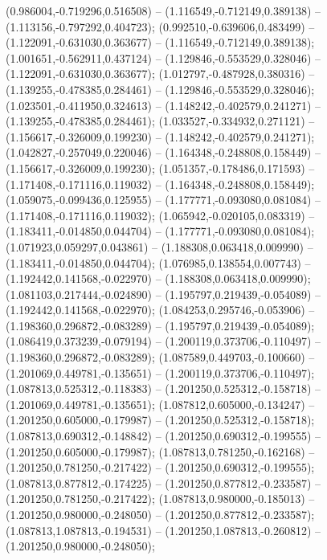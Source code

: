  (0.986004,-0.719296,0.516508) -- (1.116549,-0.712149,0.389138) -- (1.113156,-0.797292,0.404723);
 (0.992510,-0.639606,0.483499) -- (1.122091,-0.631030,0.363677) -- (1.116549,-0.712149,0.389138);
 (1.001651,-0.562911,0.437124) -- (1.129846,-0.553529,0.328046) -- (1.122091,-0.631030,0.363677);
 (1.012797,-0.487928,0.380316) -- (1.139255,-0.478385,0.284461) -- (1.129846,-0.553529,0.328046);
 (1.023501,-0.411950,0.324613) -- (1.148242,-0.402579,0.241271) -- (1.139255,-0.478385,0.284461);
 (1.033527,-0.334932,0.271121) -- (1.156617,-0.326009,0.199230) -- (1.148242,-0.402579,0.241271);
 (1.042827,-0.257049,0.220046) -- (1.164348,-0.248808,0.158449) -- (1.156617,-0.326009,0.199230);
 (1.051357,-0.178486,0.171593) -- (1.171408,-0.171116,0.119032) -- (1.164348,-0.248808,0.158449);
 (1.059075,-0.099436,0.125955) -- (1.177771,-0.093080,0.081084) -- (1.171408,-0.171116,0.119032);
 (1.065942,-0.020105,0.083319) -- (1.183411,-0.014850,0.044704) -- (1.177771,-0.093080,0.081084);
 (1.071923,0.059297,0.043861) -- (1.188308,0.063418,0.009990) -- (1.183411,-0.014850,0.044704);
 (1.076985,0.138554,0.007743) -- (1.192442,0.141568,-0.022970) -- (1.188308,0.063418,0.009990);
 (1.081103,0.217444,-0.024890) -- (1.195797,0.219439,-0.054089) -- (1.192442,0.141568,-0.022970);
 (1.084253,0.295746,-0.053906) -- (1.198360,0.296872,-0.083289) -- (1.195797,0.219439,-0.054089);
 (1.086419,0.373239,-0.079194) -- (1.200119,0.373706,-0.110497) -- (1.198360,0.296872,-0.083289);
 (1.087589,0.449703,-0.100660) -- (1.201069,0.449781,-0.135651) -- (1.200119,0.373706,-0.110497);
 (1.087813,0.525312,-0.118383) -- (1.201250,0.525312,-0.158718) -- (1.201069,0.449781,-0.135651);
 (1.087812,0.605000,-0.134247) -- (1.201250,0.605000,-0.179987) -- (1.201250,0.525312,-0.158718);
 (1.087813,0.690312,-0.148842) -- (1.201250,0.690312,-0.199555) -- (1.201250,0.605000,-0.179987);
 (1.087813,0.781250,-0.162168) -- (1.201250,0.781250,-0.217422) -- (1.201250,0.690312,-0.199555);
 (1.087813,0.877812,-0.174225) -- (1.201250,0.877812,-0.233587) -- (1.201250,0.781250,-0.217422);
 (1.087813,0.980000,-0.185013) -- (1.201250,0.980000,-0.248050) -- (1.201250,0.877812,-0.233587);
 (1.087813,1.087813,-0.194531) -- (1.201250,1.087813,-0.260812) -- (1.201250,0.980000,-0.248050);

